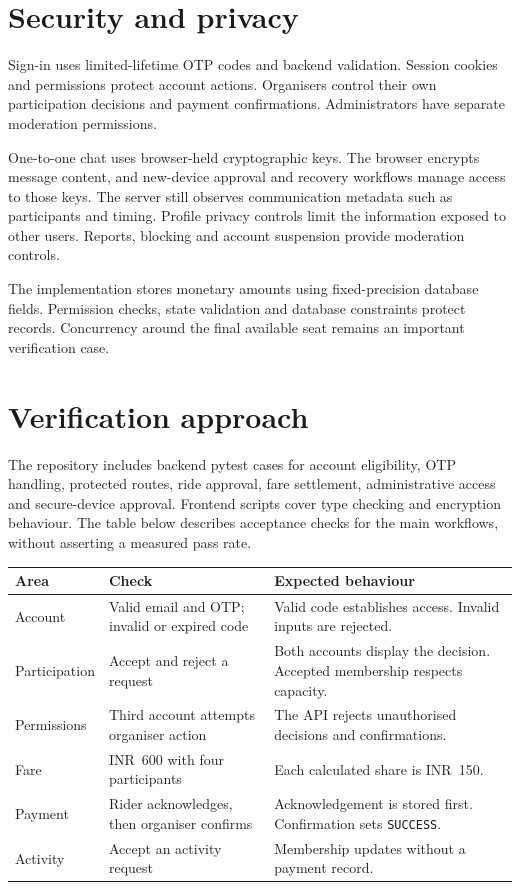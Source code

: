 \documentclass[11pt,a4paper]{article}
\begin{document}
\clearpage
\section{Security and privacy}
Sign-in uses limited-lifetime OTP codes and backend validation. Session cookies and permissions protect account actions. Organisers control their own participation decisions and payment confirmations. Administrators have separate moderation permissions.

One-to-one chat uses browser-held cryptographic keys. The browser encrypts message content, and new-device approval and recovery workflows manage access to those keys. The server still observes communication metadata such as participants and timing. Profile privacy controls limit the information exposed to other users. Reports, blocking and account suspension provide moderation controls.

The implementation stores monetary amounts using fixed-precision database fields. Permission checks, state validation and database constraints protect records. Concurrency around the final available seat remains an important verification case.

\section{Verification approach}
The repository includes backend pytest cases for account eligibility, OTP handling, protected routes, ride approval, fare settlement, administrative access and secure-device approval. Frontend scripts cover type checking and encryption behaviour. The table below describes acceptance checks for the main workflows, without asserting a measured pass rate.

\begin{tabularx}{\linewidth}{@{}p{27mm}Y Y@{}}
\toprule
\textbf{Area} & \textbf{Check} & \textbf{Expected behaviour}\\
\midrule
Account & Valid email and OTP; invalid or expired code & Valid code establishes access. Invalid inputs are rejected.\\[3pt]
Participation & Accept and reject a request & Both accounts display the decision. Accepted membership respects capacity.\\[3pt]
Permissions & Third account attempts organiser action & The API rejects unauthorised decisions and confirmations.\\[3pt]
Fare & INR~600 with four participants & Each calculated share is INR~150.\\[3pt]
Payment & Rider acknowledges, then organiser confirms & Acknowledgement is stored first. Confirmation sets \texttt{SUCCESS}.\\[3pt]
Activity & Accept an activity request & Membership updates without a payment record.\\
\bottomrule
\end{tabularx}
\end{document}
